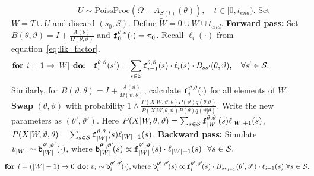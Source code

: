 \begin{algorithm}[H]
\begin{algorithmic}[1]
    \vspace{-.05in}
    $\qquad \qquad \qquad \qquad U \sim \text{PoissProc}(\Omega - A_{S(t)}(\theta)), \quad t \in [0,t_{end})$.
    \State Set $W = T \cup U$ and discard $(s_0,S)$. Define $\tilde{W} = 0 \cup W \cup t_{end}$.
    \State \textbf{Forward pass:} Set $B(\theta,\vartheta) = I + \frac{A(\theta)}{\Omega(\theta, \vartheta)}$ and $\mathtt{f}^{\theta, \vartheta}_0(\cdot) = \pi_0$. Recall $\ell_i(\cdot)$ from equation~\eqref{eq:lik_factor}.
    \vspace{-.25in}
        $$\textbf{for } i=1\rightarrow |{W}|\textbf{ do:} \quad \fwd^{\theta,\vartheta}_i(s') = \sum_{s \in \cS} \fwd^{\theta,\vartheta}_{i-1}(s)\cdot \ell_{i}(s) \cdot B_{ss'}(\theta,\vartheta), \quad \forall s' \in \cS.\qquad\qquad\quad
    \vspace{-.1in}
        $$
        Similarly, for $B(\vartheta,\theta) = I + \frac{A(\vartheta)}{\Omega(\vartheta, \theta)}$, calculate $\mathtt{f}^{\vartheta,\theta}_i(\cdot)$ for all elements of $\tilde{W}$.
    \State \textbf{Swap} 
    $(\theta, \vartheta)$ with probability
     $
     1 \wedge \frac{P(X| W,\vartheta,\theta)P(\vartheta)q(\theta|\vartheta)}
        {P(X| W,\theta, \vartheta)P(\theta) q(\vartheta|\theta)}.
        $
    Write the new parameters as $(\theta',\vartheta')$.
        Here $P(X|W,\theta,\vartheta) = \sum_{s \in {\mathcal S}} \mathtt{f}^{\theta,\vartheta}_{|W|}(s)\ell_{|W|+1}(s)$, $P(X|W,\vartheta,\theta) = \sum_{s \in {\mathcal S}} \mathtt{f}^{\vartheta,\theta}_{|W|}(s)\ell_{|W|+1}(s)$.
    \State \textbf{Backward pass:}
    Simulate $v_{|W|} \sim \mathtt{b}^{\theta',\vartheta'}_{|W|}(\cdot)$, where $\mathtt{b}^{\theta',\vartheta'}_{|W|}\!(s) \propto \mathtt{f}^{\theta',\vartheta'}_{|W|}\!(s)\cdot\ell_{|W|+1}(s) \ \  \forall s \in {\mathcal S}.$ 
    \vspace{-.25in}
    $$\hspace{-.15in} \textbf{for } i=(|W|-1)\rightarrow 0\textbf{ do:} \ v_i \sim \bck^{\theta',\vartheta'}_i\!(\cdot), \text{where } 
    \bck^{\theta',\vartheta'}_i\!(s) \propto \fwd^{\theta',\vartheta'}_i\!(s)\cdot B_{sv_{i+1}}(\theta',\vartheta') \cdot \ell_{i+1}(s)  \ \forall s \in \cS.$$
    

\end{algorithmic}
\end{algorithm}
